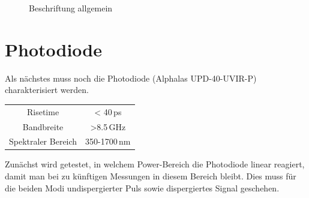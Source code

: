 \documentclass[bachelor,       %
               twoside,        %
               BCOR10mm,       %
               english,ngerman, %
               ]{GAUBM}
\begin{document}
 \begin{figure}[!htb]
   \centering
   \hfill
   \hfill
   \caption{Beschriftung allgemein}
   \label{fig:label-gesamt}
 \end{figure}

\section{Photodiode}
Als nächstes muss noch die Photodiode (Alphalas UPD-40-UVIR-P) charakterisiert werden.
\begin{table}[!htb]
	\centering
	\begin{tabular}{|c|c|}
		\hline
		Risetime & < 40\,ps \\
		Bandbreite & >8.5\,GHz \\
		Spektraler Bereich & 350-1700\,nm \\
		\hline	
	\end{tabular}
\end{table}
Zunächst wird getestet, in welchem Power-Bereich die Photodiode linear reagiert, damit man bei zu künftigen Messungen in diesem Bereich bleibt.
Dies muss für die beiden Modi undispergierter Puls sowie dispergiertes Signal geschehen.
\end{document}
